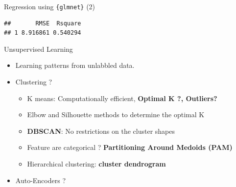 \documentclass[12pt,ignorenonframetext,]{beamer}
\newenvironment{Shaded}{\begin{snugshade}}{\end{snugshade}}
\newcommand{\CommentTok}[1]{\textcolor[rgb]{0.56,0.35,0.01}{\textit{#1}}}
\newcommand{\DataTypeTok}[1]{\textcolor[rgb]{0.13,0.29,0.53}{#1}}
\newcommand{\KeywordTok}[1]{\textcolor[rgb]{0.13,0.29,0.53}{\textbf{#1}}}
\newcommand{\NormalTok}[1]{#1}
\newcommand{\OperatorTok}[1]{\textcolor[rgb]{0.81,0.36,0.00}{\textbf{#1}}}
\newcommand{\StringTok}[1]{\textcolor[rgb]{0.31,0.60,0.02}{#1}}
\providecommand{\tightlist}{%
  \setlength{\itemsep}{0pt}\setlength{\parskip}{0pt}}
\begin{document}
\begin{frame}[fragile]{Regression using \texttt{\{glmnet\}} (2)}
\protect\hypertarget{regression-using-2-1}{}

\tiny

\begin{Shaded}
\end{Shaded}

\begin{verbatim}
##       RMSE  Rsquare
## 1 8.916861 0.540294
\end{verbatim}

\normalsize

\end{frame}

\begin{frame}{Unsupervised Learning}
\protect\hypertarget{unsupervised-learning}{}

\begin{itemize}
\tightlist
\item
  Learning patterns from unlabbled data. \vspace{2mm}
\item
  Clustering ? \vspace{2mm}

  \begin{itemize}
      \item K means: Computationally efficient, \textbf{Optimal K ?, Outliers?}
      \item Elbow and Silhouette methods to determine the optimal K
      \item \textbf{DBSCAN}: No restrictions on the cluster shapes
      \item Feature are categorical ? \textbf{Partitioning Around Medoids (PAM)}
      \item Hierarchical clustering: \textbf{cluster dendrogram}
    \end{itemize}
  \vspace{2mm}
\item
  Auto-Encoders ?
\end{itemize}

\end{frame}
\end{document}
